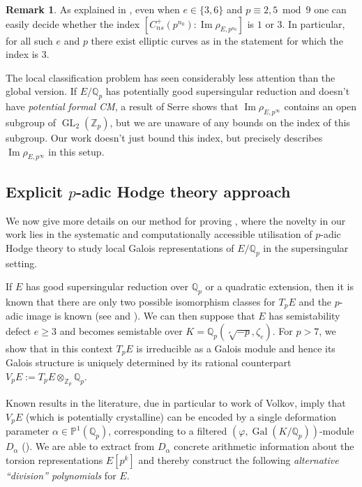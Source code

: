 \documentclass{amsart}
\newcommand{\op}[1]{\operatorname{#1}}
\newcommand{\Qp}{\mathbb{Q}_p}
\theoremstyle{definition}
\newtheorem{remark}[theorem]{Remark}
\newcommand{\Z}{\mathbb{Z}}
\newcommand{\Q}{\mathbb{Q}}
\newcommand{\Gal}{\operatorname{Gal}}
\newcommand{\GL}{\operatorname{GL}}
\numberwithin{theorem}{section}
\numberwithin{equation}{section}
\begin{document}
\begin{remark}
    As explained in , even when $e \in \{3,6\}$ and $p \equiv 2,5 \bmod 9$ one can easily decide whether the index $[C_{ns}^+(p^{n_0}) : \operatorname{Im}\rho_{E,p^{n_0}}]$ is $1$ or $3$. In particular, for all such $e$ and $p$ there exist elliptic curves as in the statement for which the index is $3$.
\end{remark}


The local classification problem has seen considerably less attention than the global version. If $E/\Qp$ has potentially good supersingular reduction and doesn't have \textit{potential formal CM}, a result of Serre \cite[Théorème 5]{MR242839} shows that $\op{Im} \rho_{E,p^{\infty}}$ contains an open subgroup of $\GL_2(\Z_p)$, but we are unaware of any bounds on the index of this subgroup. Our work doesn't just bound this index, but precisely describes $\op{Im} \rho_{E,p^{\infty}}$ in this setup.



\subsection{Explicit $p$-adic Hodge theory approach}
We now give more details on our method for proving , where the novelty in our work lies in the systematic and computationally accessible utilisation of $p$-adic Hodge theory to study local Galois representations of $E/\Qp$ in the supersingular setting.

If $E$ has good supersingular reduction over $\Qp$ or a quadratic extension, then it is known that there are only two possible isomorphism classes for $T_pE$ and the $p$-adic image is known (see \cite[top of p.~34]{Volkov} and ). We can then suppose that $E$ has semistability defect $e \geq 3$ and becomes semistable over $K=\Qp(\sqrt[e]{-p},\zeta_e)$. For $p>7$, we show that in this context $T_pE$ is irreducible as a Galois module and hence its Galois structure is uniquely determined by its rational counterpart $V_pE:=T_pE \otimes_{\Z_p} \Q_p$.

Known results in the literature, due in particular to work of Volkov, imply that $V_pE$ (which is potentially crystalline) can be encoded by a single deformation parameter $\alpha \in \mathbb{P}^1(\Qp)$, corresponding to a filtered $(\varphi,\Gal(K/\Qp))$-module $D_{\alpha}$ (). We are able to extract from $D_\alpha$ concrete arithmetic information about the torsion representations $E[p^k]$ and thereby construct the following \textit{alternative ``division'' polynomials} for $E$.
\end{document}
